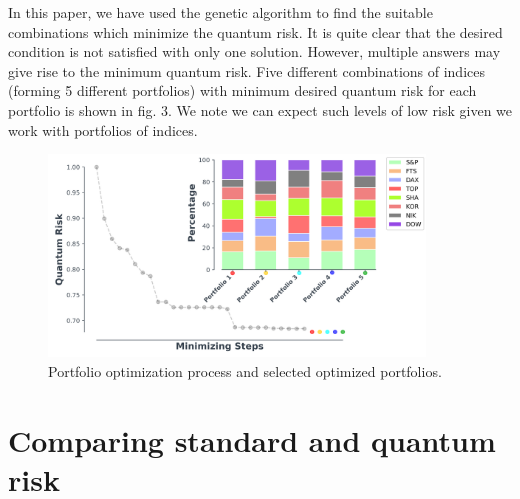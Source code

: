 \documentclass[ aip,jmp,reprint]{revtex4-2}
\begin{document}
In this paper, we have used the genetic algorithm to find the suitable
combinations which minimize the quantum risk. It is quite clear that the
desired condition is not satisfied with only one solution. However, multiple
answers may give rise to the minimum quantum risk. Five different
combinations of indices (forming 5 different portfolios) with minimum
desired quantum risk for each portfolio is shown in fig. 3. We note we can
expect such levels of low risk given we work with portfolios of indices.  
\begin{figure}[tbh]
\centering
\includegraphics[width=100mm]{fig6pr.png}
\caption{Portfolio optimization process and selected optimized portfolios.}
\label{fig:3}
\end{figure}
\newline
\newpage 

\section{Comparing standard and quantum risk}
\end{document}
